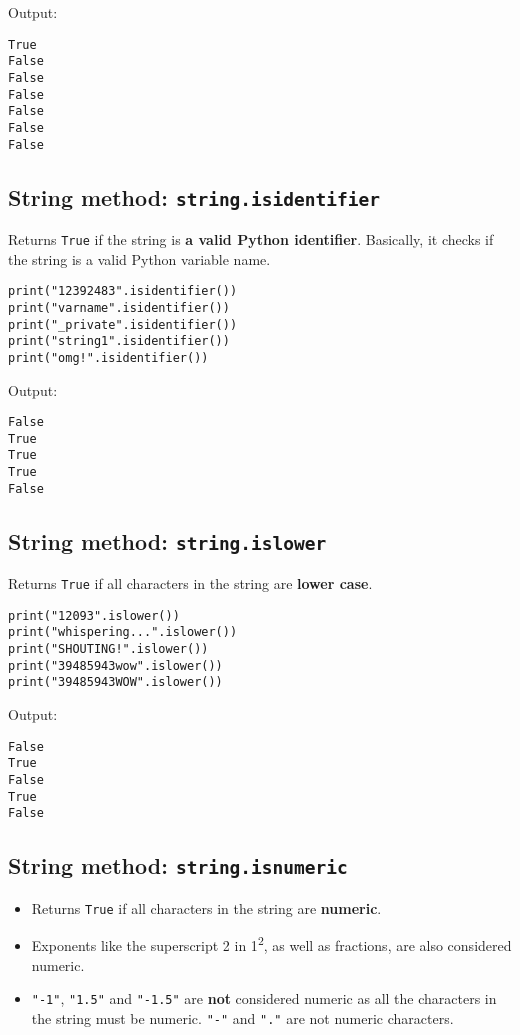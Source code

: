 \documentclass[11pt]{article}
\begin{document}
 \noindent Output:

\label{org5b85f36}
\begin{verbatim}
True
False
False
False
False
False
False
\end{verbatim}
\subsection{String method: \texttt{string.isidentifier}}
\label{sec:org6c23b13}
Returns \texttt{True} if the string is \textbf{a valid Python identifier}. Basically, it checks if the string is a valid Python variable name.

\begin{verbatim}
print("12392483".isidentifier())
print("varname".isidentifier())
print("_private".isidentifier())
print("string1".isidentifier())
print("omg!".isidentifier())
\end{verbatim}

 \noindent Output:

\label{org70bb563}
\begin{verbatim}
False
True
True
True
False
\end{verbatim}
\subsection{String method: \texttt{string.islower}}
\label{sec:org7390898}
Returns \texttt{True} if all characters in the string are \textbf{lower case}.

\begin{verbatim}
print("12093".islower())
print("whispering...".islower())
print("SHOUTING!".islower())
print("39485943wow".islower())
print("39485943WOW".islower())
\end{verbatim}

 \noindent Output:

\label{orgdb385a4}
\begin{verbatim}
False
True
False
True
False
\end{verbatim}


 \newpage
\subsection{String method: \texttt{string.isnumeric}}
\label{sec:orge7977d0}
\begin{itemize}
\item Returns \texttt{True} if all characters in the string are \textbf{numeric}.
\item Exponents like the superscript 2 in 1\textsuperscript{2}, as well as fractions, are also considered numeric.
\item \texttt{"-1"}, \texttt{"1.5"} and \texttt{"-1.5"} are \textbf{not} considered numeric as all the characters in the string must be numeric. \texttt{"-"} and \texttt{"."} are not numeric characters.
\end{itemize}
\end{document}

